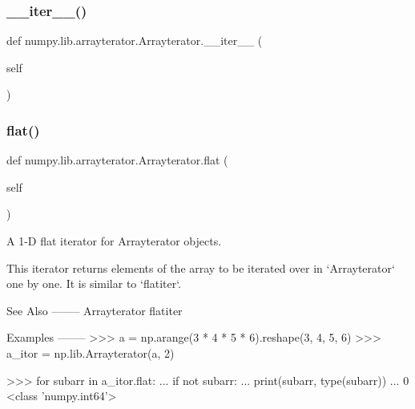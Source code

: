 \subsubsection{\texorpdfstring{\+\_\+\+\_\+iter\+\_\+\+\_\+()}{\_\_iter\_\_()}}
{\footnotesize\ttfamily def numpy.\+lib.\+arrayterator.\+Arrayterator.\+\_\+\+\_\+iter\+\_\+\+\_\+ (\begin{DoxyParamCaption}\item[{}]{self }\end{DoxyParamCaption})}

\mbox{\label{classnumpy_1_1lib_1_1arrayterator_1_1Arrayterator_a69d2bd2bce37726add2ab09186bee9e8}} 
\subsubsection{\texorpdfstring{flat()}{flat()}}
{\footnotesize\ttfamily def numpy.\+lib.\+arrayterator.\+Arrayterator.\+flat (\begin{DoxyParamCaption}\item[{}]{self }\end{DoxyParamCaption})}

\begin{DoxyVerb}A 1-D flat iterator for Arrayterator objects.

This iterator returns elements of the array to be iterated over in
`Arrayterator` one by one. It is similar to `flatiter`.

See Also
--------
Arrayterator
flatiter

Examples
--------
>>> a = np.arange(3 * 4 * 5 * 6).reshape(3, 4, 5, 6)
>>> a_itor = np.lib.Arrayterator(a, 2)

>>> for subarr in a_itor.flat:
...     if not subarr:
...         print(subarr, type(subarr))
...
0 <class 'numpy.int64'>\end{DoxyVerb}
 \mbox{\label{classnumpy_1_1lib_1_1arrayterator_1_1Arrayterator_a547921c8112ebd555c7a5759c605bea4}} 
